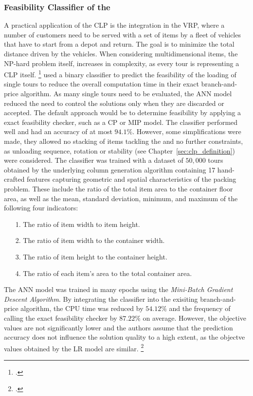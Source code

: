 \subsubsection{Feasibility Classifier of the }
A practical application of the \gls{CLP} is the integration in the \gls{VRP}, where
a number of customers need to be served with a set of items by a fleet of vehicles that have
to start from a depot and return. The goal is to minimize the total distance driven
by the vehicles. When considering multidimensional items, the NP-hard problem itself,
increases in complexity, as every tour is representing a \gls{CLP} itself. \footcite[cf.][pp. 1--2]{tamke_branch-and-cut_2024}
\citeauthor*{zhang_learning-based_2022} used a binary classifier to predict the feasibility of the
loading of single tours to reduce the overall computation time in their exact branch-and-price
algorithm. As many single tours need to be evaluated, the \gls{ANN} model reduced the need
to control the solutions only when they are discarded or accepted. The default approach would be to
determine feasibility by applying a exact feasibility checker, such as a \gls{CP} or \gls{MIP} model.
The classifier performed well and had an accuracy of at most $94.1\%$. However, some simplifications were made,
they allowed no stacking of items tackling the  and no further constraints,
as unloading sequence, rotation or stability (see Chapter~\ref{sec:clp_definition}) were considered.
The classifier was trained with a dataset of $50,000$ tours obtained by the underlying column generation
algorithm containing 17 hand-crafted features capturing geometric
and spatial characteristics of the packing problem. These include the ratio of the total item area
to the container floor area, as well as the mean, standard deviation, minimum, and maximum of
the following four indicators:
\begin{itemize}
    \item[1.] The ratio of item width to item height.
    \item[2.] The ratio of item width to the container width.
    \item[3.] The ratio of item height to the container height.
    \item[4.] The ratio of each item’s area to the total container area.
\end{itemize}
The \gls{ANN} model was trained in many epochs
using the \textit{Mini-Batch Gradient Descent Algorithm}. By integrating the classifier into the
exisiting branch-and-price algorithm, the CPU time was reduced by $54.12\%$ and the frequency of
calling the exact feasibility checker by $87.22\%$ on average. However, the objective values are not significantly
lower and the authors assume that the prediction accuracy does not influence the solution quality
to a high extent, as the objectve values obtained by the \gls{LR} model are similar. \footcite[cf.][pp. 4, 9--15]{zhang_learning-based_2022}

